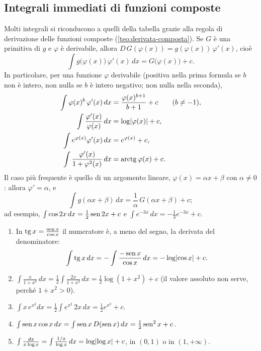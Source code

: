 \subsection{Integrali immediati di funzioni composte}

Molti integrali si riconducono a quelli della tabella grazie alla regola di derivazione
delle funzioni composte (\cref{teo:derivata-composta}). Se $G$ è una primitiva di $g$ e
$\varphi$ è derivabile, allora $D\,G(\varphi(x))=g(\varphi(x))\,\varphi'(x)$, cioè
\begin{equation}\label{eq:composta-indefinito}
  \int g\bigl(\varphi(x)\bigr)\,\varphi'(x)\,dx=G\bigl(\varphi(x)\bigr)+c .
\end{equation}
In particolare, per una funzione $\varphi$ derivabile (positiva nella prima formula se $b$
non è intero, non nulla se $b$ è intero negativo; non nulla nella seconda),
\begin{equation}\label{eq:integrali-composti}
\begin{aligned}
  \int\varphi(x)^{b}\,\varphi'(x)\,dx&=\frac{\varphi(x)^{b+1}}{b+1}+c \qquad (b\neq-1),\\
  \int\frac{\varphi'(x)}{\varphi(x)}\,dx&=\log\lvert \varphi(x)\rvert+c,\\
  \int e^{\varphi(x)}\varphi'(x)\,dx&=e^{\varphi(x)}+c,\\
  \int\frac{\varphi'(x)}{1+\varphi^{2}(x)}\,dx&=\operatorname{arctg}\varphi(x)+c .
\end{aligned}
\end{equation}
Il caso più frequente è quello di un argomento lineare, $\varphi(x)=\alpha x+\beta$ con
$\alpha\neq0$: allora $\varphi'=\alpha$, e
\begin{equation}\label{eq:argomento-lineare}
  \int g(\alpha x+\beta)\,dx=\frac1\alpha\,G(\alpha x+\beta)+c ;
\end{equation}
ad esempio, $\int\cos2x\,dx=\frac12\operatorname{sen}2x+c$ e $\int e^{-3x}\,dx=-\frac13e^{-3x}+c$.

\begin{esempio}\label{es:integrali-composti}
\begin{enumerate}[label=\textup{(\alph*)}]
  \item In $\operatorname{tg} x=\frac{\operatorname{sen} x}{\cos x}$ il numeratore è, a meno del segno, la derivata
  del denominatore:
  \begin{equation}\label{eq:integrale-tg}
    \int\operatorname{tg} x\,dx=-\int\frac{-\operatorname{sen} x}{\cos x}\,dx=-\log\lvert \cos x\rvert+c .
  \end{equation}
  \item $\int\frac x{1+x^{2}}\,dx=\frac12\int\frac{2x}{1+x^{2}}\,dx=\frac12\log(1+x^{2})+c$ (il valore
  assoluto non serve, perché $1+x^{2}>0$).
  \item $\int x\,e^{x^{2}}dx=\frac12\int e^{x^{2}}\,2x\,dx=\frac12e^{x^{2}}+c$.
  \item $\int\operatorname{sen} x\cos x\,dx=\int\operatorname{sen} x\,D(\operatorname{sen} x)\,dx=\frac12\operatorname{sen}^{2}x+c$.
  \item $\int\frac{dx}{x\log x}=\int\frac{1/x}{\log x}\,dx=\log\lvert \log x\rvert+c$, in $(0,1)$ o in
  $(1,+\infty)$.
\end{enumerate}
\end{esempio}

